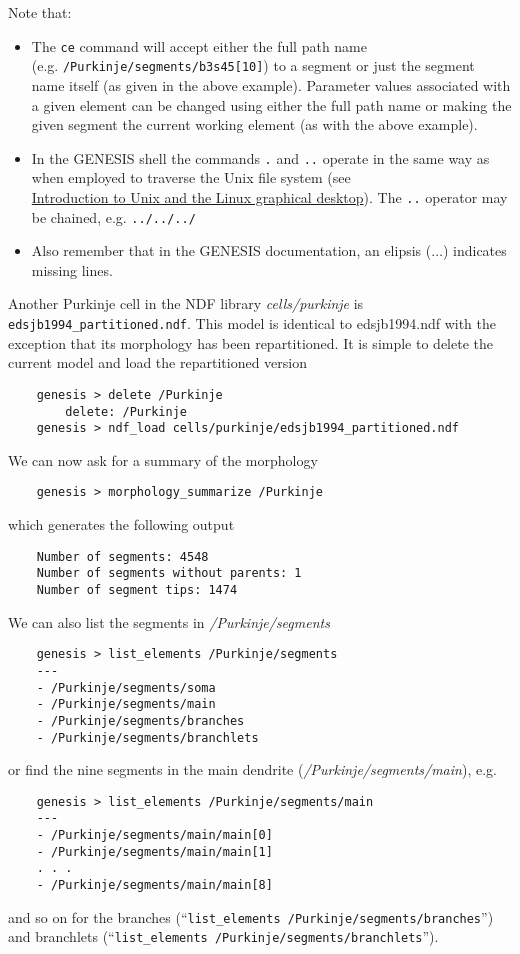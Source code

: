 \documentclass[12pt]{article}
\begin{document}
Note that:
\begin{itemize}

\item The {\tt ce} command will accept either the full path name\\(e.g. {\tt  /Purkinje/segments/b3s45[10]}) to a segment or just the segment name itself (as given in the above example).  Parameter values associated with a given element can be changed using either the full path name or making the given segment the current working element (as with the above example).

\item In the GENESIS shell the commands {\tt .} and {\tt ..} operate in the same way as when employed to traverse the Unix file system (see \\\href{../unix-linux/unix-linux.pdf}{Introduction to Unix and the Linux graphical desktop}). The {\tt ..} operator may be chained, e.g. {\tt ../../../}

\item Also remember that in the GENESIS documentation, an elipsis ($\ldots$) indicates missing lines.

\end{itemize}

Another Purkinje cell in the NDF library {\it cells/purkinje} is {\tt edsjb1994\_partitioned.ndf}. This model is identical to edsjb1994.ndf with the exception that its morphology has been repartitioned. It is simple to delete the current model and load the repartitioned version
\begin{verbatim}
    genesis > delete /Purkinje
        delete: /Purkinje
    genesis > ndf_load cells/purkinje/edsjb1994_partitioned.ndf
\end{verbatim}
We can now ask for a summary of the morphology
\begin{verbatim}
    genesis > morphology_summarize /Purkinje
\end{verbatim}
which generates the following output
\begin{verbatim}
    Number of segments: 4548
    Number of segments without parents: 1
    Number of segment tips: 1474
\end{verbatim}
We can also list the segments in {\it /Purkinje/segments}
\begin{verbatim}
    genesis > list_elements /Purkinje/segments
    ---
    - /Purkinje/segments/soma
    - /Purkinje/segments/main
    - /Purkinje/segments/branches
    - /Purkinje/segments/branchlets
\end{verbatim}
or find the nine segments in the main dendrite ({\it /Purkinje/segments/main}), e.g.
\begin{verbatim}
    genesis > list_elements /Purkinje/segments/main
    ---
    - /Purkinje/segments/main/main[0]
    - /Purkinje/segments/main/main[1]
    . . . 
    - /Purkinje/segments/main/main[8]
\end{verbatim}
and so on for the branches (``{\tt list\_elements /Purkinje/segments/branches}'') and branchlets (``{\tt list\_elements /Purkinje/segments/branchlets}'').
\end{document}
